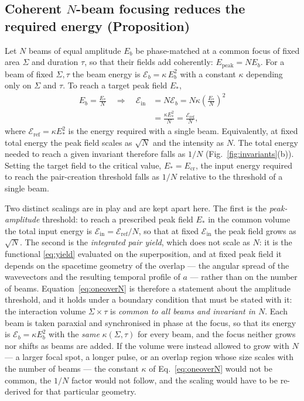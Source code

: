 \documentclass[aps,prd,reprint,superscriptaddress,nofootinbib,floatfix]{revtex4-2}
\begin{document}
\subsection{Coherent $N$-beam focusing reduces the required energy (Proposition)}

Let $N$ beams of equal amplitude $E_b$ be phase-matched at a common focus of
fixed area $\Sigma$ and duration $\tau$, so that their fields add coherently:
$E_{\mathrm{peak}}=N E_b$. For a beam of fixed $\Sigma,\tau$ the beam energy is
$\mathcal{E}_b=\kappa\,E_b^{2}$ with a constant $\kappa$ depending only on
$\Sigma$ and $\tau$. To reach a target peak field $E_\ast$,
\begin{equation}
\begin{aligned}
E_b=\frac{E_\ast}{N}
\quad\Longrightarrow\quad
\mathcal{E}_{\mathrm{in}}&=N\mathcal{E}_b
=N\kappa\!\left(\frac{E_\ast}{N}\right)^{2}\\
&=\frac{\kappa E_\ast^{2}}{N}
=\frac{\mathcal{E}_{\mathrm{ref}}}{N},
\end{aligned}
\label{eq:oneoverN}
\end{equation}
where $\mathcal{E}_{\mathrm{ref}}=\kappa E_\ast^{2}$ is the energy required
with a single beam. Equivalently, at fixed total energy the peak field scales
as $\sqrt{N}$ and the intensity as $N$. The total energy needed to reach a
given invariant therefore falls as $1/N$ (Fig.~\ref{fig:invariants}(b)).
Setting the target field to the critical value, $E_\ast=E_{\mathrm{cr}}$, the
input energy required to reach the pair-creation threshold falls as $1/N$
relative to the threshold of a single beam.

Two distinct scalings are in play and are kept apart here. The first is the
\emph{peak-amplitude} threshold: to reach a prescribed peak field $E_\ast$
in the common volume the total input energy is
$\mathcal{E}_{\mathrm{in}}=\mathcal{E}_{\mathrm{ref}}/N$, so that at fixed
$\mathcal{E}_{\mathrm{in}}$ the peak field grows as $\sqrt{N}$. The second
is the \emph{integrated pair yield}, which does not scale as $N$: it is the
functional \eqref{eq:yield} evaluated on the superposition, and at fixed
peak field it depends on the spacetime geometry of the overlap --- the
angular spread of the wavevectors and the resulting temporal profile of $a$
--- rather than on the number of beams. Equation~\eqref{eq:oneoverN} is
therefore a statement about the amplitude threshold, and it holds under a
boundary condition that must be stated with it: the interaction volume
$\Sigma\times\tau$ is \emph{common to all beams and invariant in $N$}.
Each beam is taken paraxial and synchronised in phase at the focus, so that
its energy is $\mathcal{E}_b=\kappa E_b^{2}$ with the \emph{same}
$\kappa(\Sigma,\tau)$ for every beam, and the focus neither grows nor
shifts as beams are added. If the volume were instead allowed to grow with
$N$ --- a larger focal spot, a longer pulse, or an overlap region whose size
scales with the number of beams --- the constant $\kappa$ of
Eq.~\eqref{eq:oneoverN} would not be common, the $1/N$ factor would not
follow, and the scaling would have to be re-derived for that particular
geometry.
\end{document}
